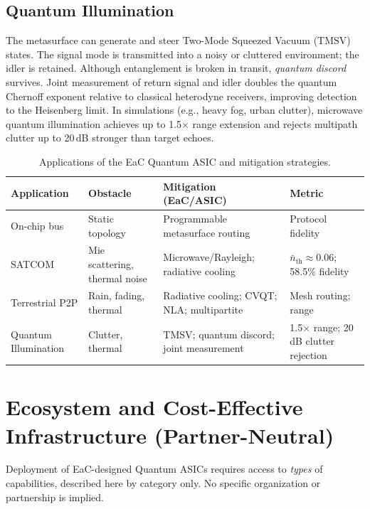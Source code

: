 \documentclass[11pt, a4paper]{article}
\begin{document}
\subsection{Quantum Illumination}

The metasurface can generate and steer Two-Mode Squeezed Vacuum (TMSV) states. The signal mode is transmitted into a noisy or cluttered environment; the idler is retained. Although entanglement is broken in transit, \emph{quantum discord} survives. Joint measurement of return signal and idler doubles the quantum Chernoff exponent relative to classical heterodyne receivers, improving detection to the Heisenberg limit. In simulations (e.g., heavy fog, urban clutter), microwave quantum illumination achieves up to 1.5$\times$ range extension and rejects multipath clutter up to 20\,dB stronger than target echoes.

\begin{table}[htbp]
\centering
\renewcommand{\arraystretch}{1.3}
\begin{tabular}{p{}p{}p{}p{}}
\toprule
\textbf{Application} & \textbf{Obstacle} & \textbf{Mitigation (EaC/ASIC)} & \textbf{Metric} \\
\midrule
On-chip bus & Static topology & Programmable metasurface routing & Protocol fidelity \\
SATCOM & Mie scattering, thermal noise & Microwave/Rayleigh; radiative cooling & $\bar{n}_{\mathrm{th}} \approx 0.06$; 58.5\% fidelity \\
Terrestrial P2P & Rain, fading, thermal & Radiative cooling; CVQT; NLA; multipartite & Mesh routing; range \\
Quantum Illumination & Clutter, thermal & TMSV; quantum discord; joint measurement & 1.5$\times$ range; 20\,dB clutter rejection \\
\bottomrule
\end{tabular}
\caption{Applications of the EaC Quantum ASIC and mitigation strategies.}
\end{table}

\section{Ecosystem and Cost-Effective Infrastructure (Partner-Neutral)}

Deployment of EaC-designed Quantum ASICs requires access to \emph{types} of capabilities, described here by category only. No specific organization or partnership is implied.
\end{document}
